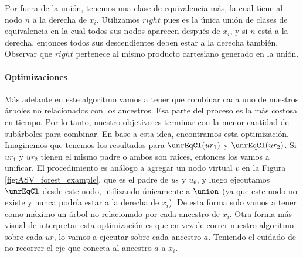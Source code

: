 Por fuera de la unión, tenemos una clase de equivalencia más, la cual tiene al nodo $n$ a la derecha de $x_i$. Utilizamos $right$ pues es la única unión de clases de equivalencia en la cual todos sus nodos aparecen después de $x_i$, y si $n$ está a la derecha, entonces todos sus descendientes deben estar a la derecha también. Observar que $right$ pertenece al mismo producto cartesiano generado en la unión. %

\paragraph{Optimizaciones}\label{slight_improvement}

Más adelante en este algoritmo vamos a tener que combinar cada uno de nuestros árboles no relacionados con los ancestros. Esa parte del proceso es la más costosa en tiempo. Por lo tanto, nuestro objetivo es terminar con la menor cantidad de subárboles para combinar. En base a esta idea, encontramos esta optimización. Imaginemos que tenemos los resultados para $\unrEqCl(ur_1)$ y $\unrEqCl(ur_2)$. Si $ur_1$ y $ur_2$ tienen el mismo padre o ambos son raíces, entonces los vamos a unificar. El procedimiento es análogo a agregar un nodo virtual $v$ en la Figura \ref{fig:ASV_forest_example}, que es el padre de $u_5$ y $u_6$, y luego ejecutamos $\unrEqCl$ desde este nodo, utilizando únicamente a $\union$ (ya que este nodo no existe y nunca podría estar a la derecha de $x_i$). De esta forma solo vamos a tener como máximo un árbol no relacionado por cada ancestro de $x_i$. Otra forma más visual de interpretar esta optimización es que en vez de correr nuestro algoritmo sobre cada $ur$, lo vamos a ejecutar sobre cada ancestro $a$. Teniendo el cuidado de no recorrer el eje que conecta al ancestro $a$ a $x_i$.

